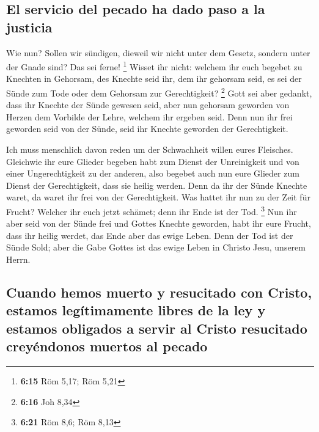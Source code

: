 \hypertarget{el-servicio-del-pecado-ha-dado-paso-a-la-justicia}{%
\subsection{El servicio del pecado ha dado paso a la
justicia}\label{el-servicio-del-pecado-ha-dado-paso-a-la-justicia}}

 Wie nun? Sollen wir sündigen, dieweil wir nicht unter
dem Gesetz, sondern unter der Gnade sind? Das sei ferne! \footnote{\textbf{6:15}
  Röm 5,17; Röm 5,21}  Wisset ihr nicht: welchem ihr euch
begebet zu Knechten in Gehorsam, des Knechte seid ihr, dem ihr gehorsam
seid, es sei der Sünde zum Tode oder dem Gehorsam zur Gerechtigkeit?
\footnote{\textbf{6:16} Joh 8,34}  Gott sei aber gedankt,
dass ihr Knechte der Sünde gewesen seid, aber nun gehorsam geworden von
Herzen dem Vorbilde der Lehre, welchem ihr ergeben seid. 
Denn nun ihr frei geworden seid von der Sünde, seid ihr Knechte geworden
der Gerechtigkeit.

 Ich muss menschlich davon reden um der Schwachheit
willen eures Fleisches. Gleichwie ihr eure Glieder begeben habt zum
Dienst der Unreinigkeit und von einer Ungerechtigkeit zu der anderen,
also begebet auch nun eure Glieder zum Dienst der Gerechtigkeit, dass
sie heilig werden.  Denn da ihr der Sünde Knechte waret,
da waret ihr frei von der Gerechtigkeit.  Was hattet ihr
nun zu der Zeit für Frucht? Welcher ihr euch jetzt schämet; denn ihr
Ende ist der Tod. \footnote{\textbf{6:21} Röm 8,6; Röm 8,13}
 Nun ihr aber seid von der Sünde frei und Gottes Knechte
geworden, habt ihr eure Frucht, dass ihr heilig werdet, das Ende aber
das ewige Leben.  Denn der Tod ist der Sünde Sold; aber
die Gabe Gottes ist das ewige Leben in Christo Jesu, unserem Herrn.

\hypertarget{cuando-hemos-muerto-y-resucitado-con-cristo-estamos-leguxedtimamente-libres-de-la-ley-y-estamos-obligados-a-servir-al-cristo-resucitado-creyuxe9ndonos-muertos-al-pecado}{%
\subsection{Cuando hemos muerto y resucitado con Cristo, estamos
legítimamente libres de la ley y estamos obligados a servir al Cristo
resucitado creyéndonos muertos al
pecado}\label{cuando-hemos-muerto-y-resucitado-con-cristo-estamos-leguxedtimamente-libres-de-la-ley-y-estamos-obligados-a-servir-al-cristo-resucitado-creyuxe9ndonos-muertos-al-pecado}}

